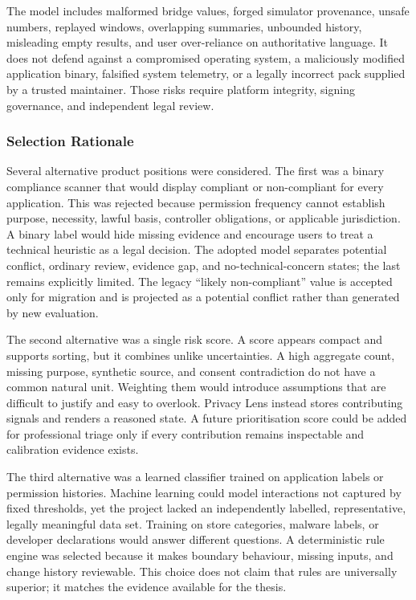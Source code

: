 The model includes malformed bridge values, forged simulator provenance, unsafe numbers, replayed windows, overlapping summaries, unbounded history, misleading empty results, and user over-reliance on authoritative language. It does not defend against a compromised operating system, a maliciously modified application binary, falsified system telemetry, or a legally incorrect pack supplied by a trusted maintainer. Those risks require platform integrity, signing governance, and independent legal review.

\subsubsection{Selection Rationale}

Several alternative product positions were considered. The first was a binary compliance scanner that would display compliant or non-compliant for every application. This was rejected because permission frequency cannot establish purpose, necessity, lawful basis, controller obligations, or applicable jurisdiction. A binary label would hide missing evidence and encourage users to treat a technical heuristic as a legal decision. The adopted model separates potential conflict, ordinary review, evidence gap, and no-technical-concern states; the last remains explicitly limited. The legacy ``likely non-compliant'' value is accepted only for migration and is projected as a potential conflict rather than generated by new evaluation.

The second alternative was a single risk score. A score appears compact and supports sorting, but it combines unlike uncertainties. A high aggregate count, missing purpose, synthetic source, and consent contradiction do not have a common natural unit. Weighting them would introduce assumptions that are difficult to justify and easy to overlook. Privacy Lens instead stores contributing signals and renders a reasoned state. A future prioritisation score could be added for professional triage only if every contribution remains inspectable and calibration evidence exists.

The third alternative was a learned classifier trained on application labels or permission histories. Machine learning could model interactions not captured by fixed thresholds, yet the project lacked an independently labelled, representative, legally meaningful data set. Training on store categories, malware labels, or developer declarations would answer different questions. A deterministic rule engine was selected because it makes boundary behaviour, missing inputs, and change history reviewable. This choice does not claim that rules are universally superior; it matches the evidence available for the thesis.

